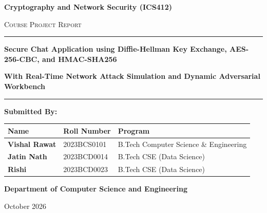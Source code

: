 \documentclass[11pt,a4paper]{article}
\begin{document}
\begin{titlepage}
    \centering
    \vspace*{0.5cm}
    
    {\huge \bfseries \color{primaryblue} Cryptography and Network Security (ICS412)\par}
    \vspace{0.4cm}
    {\Large \textsc{Course Project Report}\par}
    
    \vspace{1.2cm}
    \rule{\linewidth}{1.5pt}\par
    \vspace{0.4cm}
    {\huge \bfseries \color{darktext} Secure Chat Application using Diffie-Hellman Key Exchange, AES-256-CBC, and HMAC-SHA256\par}
    \vspace{0.3cm}
    {\large \bfseries \color{accentblue} With Real-Time Network Attack Simulation and Dynamic Adversarial Workbench\par}
    \vspace{0.4cm}
    \rule{\linewidth}{1.5pt}\par

    \vspace{1.8cm}

    {\Large \textbf{Submitted By:}\par}
    \vspace{0.4cm}
    
    \begin{table}[H]
        \centering
        \large
        \renewcommand{\arraystretch}{1.3}
        \begin{tabular}{lll}
            \textbf{Name} & \textbf{Roll Number} & \textbf{Program} \\
            \midrule
            \textbf{Vishal Rawat} & 2023BCS0101 & B.Tech Computer Science \& Engineering \\
            \textbf{Jatin Nath}   & 2023BCD0014 & B.Tech CSE (Data Science) \\
            \textbf{Rishi}        & 2023BCD0023 & B.Tech CSE (Data Science) \\
            \bottomrule
        \end{tabular}
    \end{table}

    \vfill

    {\large \textbf{Department of Computer Science and Engineering}\par}
    \vspace{0.2cm}
    {\large October 2026\par}
\end{titlepage}
\end{document}
